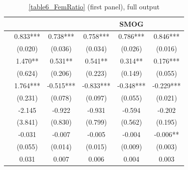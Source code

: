 \begin{table}
    \footnotesize
    \centering
    \begin{threeparttable}
        \caption{\autoref{table6_FemRatio} (first panel), full output}
        \label{table6_full}
        \begin{tabular}{p{3cm}S@{}S@{}S@{}S@{}S@{}}
            \toprule
            &{}&{}&{}&{SMOG}&{}\\
            \midrule
                    &       0.833***&       0.738***&       0.758***&       0.786***&       0.846***\\
                                          &     {(0.020)}   &     {(0.036)}   &     {(0.034)}   &     {(0.026)}   &     {(0.016)}   \\
                  &       1.470** &       0.531** &       0.541** &       0.314** &       0.176***\\
                                          &     {(0.624)}   &     {(0.206)}   &     {(0.223)}   &     {(0.149)}   &     {(0.055)}   \\
                  &       1.764***&      -0.515***&      -0.833***&      -0.348***&      -0.229***\\
                                          &     {(0.231)}   &     {(0.078)}   &     {(0.097)}   &     {(0.055)}   &     {(0.021)}   \\
            &      -2.145   &      -0.922   &      -0.931   &      -0.594   &      -0.202   \\
                                          &     {(3.841)}   &     {(0.830)}   &     {(0.799)}   &     {(0.562)}   &     {(0.195)}   \\
                    &      -0.031   &      -0.007   &      -0.005   &      -0.004   &      -0.006** \\
                                          &     {(0.055)}   &     {(0.014)}   &     {(0.015)}   &     {(0.009)}   &     {(0.003)}   \\
                    &       0.031   &       0.007   &       0.006   &       0.004   &       0.003   \\

\end{tabular}
\end{threeparttable}
\end{table}
